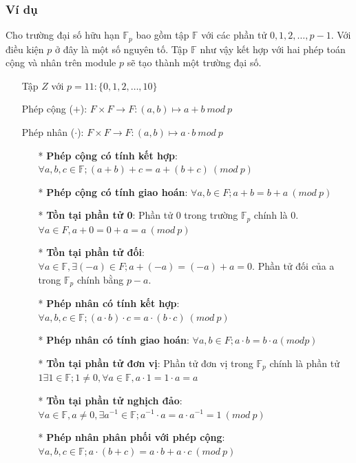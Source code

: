 \documentclass[a4paper,12pt]{report}
\begin{document}
\subsubsection*{Ví dụ}
Cho trường đại số hữu hạn $\mathbb{F}_p$ bao gồm tập $\mathbb{F}$ với các phần tử ${0, 1, 2, \ldots , p - 1}$. Với điều kiện $p$ ở đây là một số nguyên tố. Tập $\mathbb{F}$ như vậy kết hợp với hai phép toán cộng và nhân trên module $p$ sẽ tạo thành một trường đại số.
\begin{itemize}
\item[]Tập $Z$ với $p = 11: \{0, 1, 2, \ldots , 10\}$
\item[]Phép cộng ($+$): $F \times F \rightarrow F : (a, b) \mapsto a + b \ mod \  p$
\item[]Phép nhân ($\cdot$): $F \times F \rightarrow F : (a, b) \mapsto a \cdot b \ mod \ p$
\begin{itemize}
\item[*] \textbf{Phép cộng có tính kết hợp}: $\forall a, b, c \in \mathbb{F}; (a + b) + c = a + (b + c) \ (mod \ p)$
\item[*] \textbf{Phép cộng có tính giao hoán}: $\forall a, b \in F; a + b = b + a \ (mod \ p)$
\item[*] \textbf{Tồn tại phần tử 0}: Phần tử 0 trong trường $\mathbb{F}_p$ chính là 0. $\forall a \in F, a + 0 = 0 + a = a \ (mod \ p)$
\item[*] \textbf{Tồn tại phần tử đối}: $\forall a \in \mathbb{F}, \exists(-a) \in F; a + (-a) = (-a) + a = 0$. Phần tử đối của a trong $\mathbb{F}_p$ chính bằng $p - a$.
\item[*] \textbf{Phép nhân có tính kết hợp}: $\forall a, b, c \in \mathbb{F}; (a \cdot b) \cdot c = a \cdot (b \cdot c) \ (mod \ p)$
\item[*] \textbf{Phép nhân có tính giao hoán}: $\forall a, b \in F; a \cdot b = b \cdot a (mod p)$
\item[*] \textbf{Tồn tại phần tử đơn vị}: Phần tử đơn vị trong $\mathbb{F}_p$ chính là phần tử $1 \exists 1 \in \mathbb{F}; 1 \neq 0, \forall a \in \mathbb{F}, a \cdot 1 = 1 \cdot a = a$
\item[*] \textbf{Tồn tại phần tử nghịch đảo}: $\forall a \in \mathbb{F}, a \neq 0, \exists a^{-1} \in \mathbb{F}; a^{-1} \cdot a = a \cdot a^{-1} = 1 \ (mod \ p)$
\item[*] \textbf{Phép nhân phân phối với phép cộng}: $\forall a, b, c \in \mathbb{F}; a \cdot (b + c) = a \cdot b + a \cdot c \ (mod \ p)$
\end{itemize}
\end{itemize}
\end{document}
